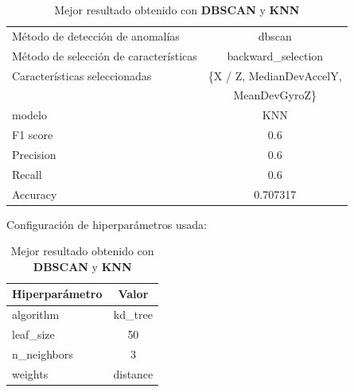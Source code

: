 \begin{appendices}
		\begin{table}[htb]
			\caption{Mejor resultado obtenido con \textbf{DBSCAN} y \textbf{KNN}}
			\label{table:19}
			\centering
			\begin{tabular}{lc}
				\toprule
				\midrule
				      Método de detección de anomalías &                                 dbscan \\
				Método de selección de características &                     backward\_selection \\
				         Características seleccionadas & \{X / Z, MedianDevAccelY,               \\
						 							   &                   MeanDevGyroZ\} \\
				                                modelo &                                    KNN \\
				                              F1 score &                                    0.6 \\
				                             Precision &                                    0.6 \\
				                                Recall &                                    0.6 \\
				                              Accuracy &                               0.707317 \\
				\bottomrule
			\end{tabular}
			\newline
			\newline
			Configuración de hiperparámetros usada:
			\begin{tabular}{lc}
				\toprule
				Hiperparámetro &    Valor \\
				\midrule
					 algorithm &  kd\_tree \\
					 leaf\_size &       50 \\
				   n\_neighbors &        3 \\
					   weights & distance \\
				\bottomrule
			\end{tabular}
			
			
		\end{table}


\end{appendices}
